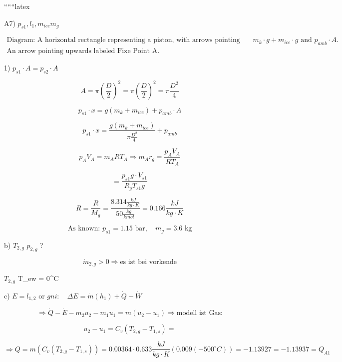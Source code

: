 
``````latex


A7) $p_{s1}, l_1, m_{ice} m_g$


\[
\begin{array}{c}
\text{Diagram: A horizontal rectangle representing a piston, with arrows pointing downwards labeled } m_k \cdot g + m_{ice} \cdot g \text{ and } p_{amb} \cdot A. \\
\text{An arrow pointing upwards labeled } \text{Fixe Point A}.
\end{array}
\]

1) $p_{s1} \cdot A = p_{s2} \cdot A$

\[
A = \pi \left( \frac{D}{2} \right)^2 = \pi \left( \frac{D}{2} \right)^2 = \pi \frac{D^2}{4}
\]

\[
p_{s1} \cdot x = g \left( m_k + m_{ice} \right) + p_{amb} \cdot A
\]

\[
p_{s1} \cdot x = \frac{g \left( m_k + m_{ice} \right)}{\pi \frac{D^2}{4}} + p_{amb}
\]

\[
p_A V_A = m_A R T_A \Rightarrow m_A r_g = \frac{p_A V_A}{R T_A}
\]


\[
= \frac{p_{s1} g \cdot V_{s1}}{R_g T_{s1} g}
\]

\[
R = \frac{R}{M_g} = \frac{8.314 \frac{kJ}{kg \cdot K}}{50 \frac{kg}{kmol}} = 0.166 \frac{kJ}{kg \cdot K}
\]

\[
\text{As known: } p_{s1} = 1.15 \text{ bar}, \quad m_g = 3.6 \text{ kg}
\]

b) $T_{2,g}$ $p_{2,g}$ ?

\[
\dot{m}_{2,g} > 0 \Rightarrow \text{es ist bei vorkende}
\]

 $T_{2,g}$  T_{ew} = 0^\circ C 

c) $E = l_{1,2} \text{ or } gni: \quad \Delta E = \dot{m} (h_1) + \dot{Q} - \dot{W}$

\[
\Rightarrow \dot{Q} - \dot{E} - m_2 u_2 - m_1 u_1 = m (u_2 - u_1) \Rightarrow \text{modell ist Gas:}
\]

\[
u_2 - u_1 = C_v (T_{2,g} - T_{1,s}) =
\]

\[
\Rightarrow Q = m \left( C_v (T_{2,g} - T_{1,s}) \right) = 0.00364 \cdot 0.633 \frac{kJ}{kg \cdot K} (0.009 (-500^\circ C)) = -1.13927 = -1.13937 = Q_{A1}
\]

